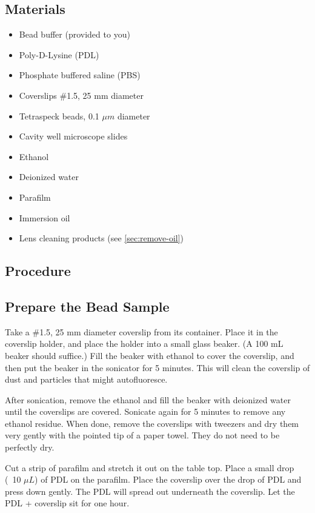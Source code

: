 \documentclass[10pt,a4paper,oneside]{book}
\begin{document}
\subsection{Materials}

\begin{itemize}
    \item{Bead buffer (provided to you)}
    \item{Poly-D-Lysine (PDL)}
    \item{Phosphate buffered saline (PBS)}
    \item{Coverslips \#1.5, 25 mm diameter}
    \item{Tetraspeck beads, 0.1 $\mu m$ diameter}
    \item{Cavity well microscope slides}
    \item{Ethanol}
    \item{Deionized water}
    \item{Parafilm}
    \item{Immersion oil}
    \item{Lens cleaning products (see \autoref{sec:remove-oil})}
\end{itemize}

\subsection{Procedure}

\subsection{Prepare the Bead Sample}

Take a \#1.5, 25 mm diameter coverslip from its container. Place it in the coverslip holder, and place the holder into a small glass beaker. (A 100 mL beaker should suffice.) Fill the beaker with ethanol to cover the coverslip, and then put the beaker in the sonicator for 5 minutes. This will clean the coverslip of dust and particles that might autofluoresce.

After sonication, remove the ethanol and fill the beaker with deionized water until the coverslips are covered. Sonicate again for 5 minutes to remove any ethanol residue. When done, remove the coverslips with tweezers and dry them very gently with the pointed tip of a paper towel. They do not need to be perfectly dry.

Cut a strip of parafilm and stretch it out on the table top. Place a small drop (~10 $\mu L$) of PDL on the parafilm. Place the coverslip over the drop of PDL and press down gently. The PDL will spread out underneath the coverslip. Let the PDL + coverslip sit for one hour.
\end{document}

